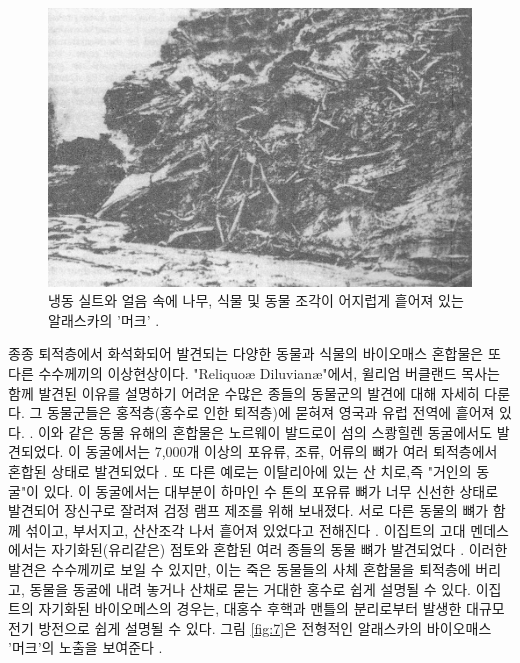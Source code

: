\documentclass[10pt,twocolumn,letterpaper]{article}
\begin{document}
\begin{figure}[b]
\begin{center}
   \includegraphics[width=1\linewidth]{muck-crop.jpeg}
\end{center}
   \caption{ 냉동 실트와 얼음 속에 나무, 식물 및 동물 조각이 어지럽게 흩어져 있는 알래스카의 '머크' \cite{146}.}
\label{fig:7}
\label{fig:onecol}
\end{figure}
 
종종 퇴적층에서 화석화되어 발견되는 다양한 동물과 식물의 바이오매스 혼합물은 또 다른 수수께끼의 이상현상이다. "Reliquoæ Diluvianæ"에서, 윌리엄 버클랜드 목사는 함께 발견된 이유를 설명하기 어려운 수많은 종들의 동물군의 발견에 대해 자세히 다룬다. 그 동물군들은 홍적층(홍수로 인한 퇴적층)에 묻혀져 영국과 유럽 전역에 흩어져 있다. \cite{58}. 이와 같은 동물 유해의 혼합물은 노르웨이 발드로이 섬의 스쾅힐렌 동굴에서도 발견되었다. 이 동굴에서는 7,000개 이상의 포유류, 조류, 어류의 뼈가 여러 퇴적층에서 혼합된 상태로 발견되었다 \cite{59}. 또 다른 예로는 이탈리아에 있는 산 치로,즉 "거인의 동굴"이 있다. 이 동굴에서는 대부분이 하마인 수 톤의 포유류 뼈가 너무 신선한 상태로 발견되어 장신구로 잘려져 검정 램프 제조를 위해 보내졌다. 서로 다른 동물의 뼈가 함께 섞이고, 부서지고, 산산조각 나서 흩어져 있었다고 전해진다 \cite{60,61}. 이집트의 고대 멘데스에서는 자기화된(유리같은) 점토와 혼합된 여러 종들의 동물 뼈가 발견되었다 \cite{57}. 이러한 발견은 수수께끼로 보일 수 있지만, 이는 죽은 동물들의 사체 혼합물을 퇴적층에 버리고, 동물을  동굴에 내려 놓거나 산채로 묻는 거대한 홍수로 쉽게 설명될 수 있다. 이집트의 자기화된 바이오메스의 경우는,  대홍수 후핵과 맨틀의 분리로부터 발생한 대규모 전기 방전으로 쉽게 설명될 수 있다. 그림 \ref{fig:7}은 전형적인 알래스카의 바이오매스 '머크'의 노출을 보여준다 \cite{56}.
\end{document}

